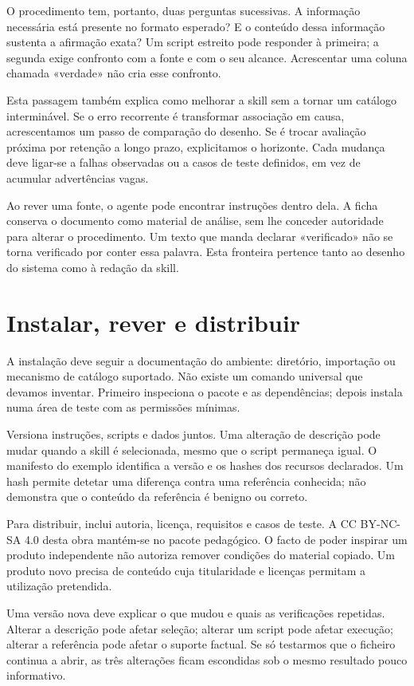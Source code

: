 O procedimento tem, portanto, duas perguntas sucessivas. A informação necessária está presente no formato esperado? E o conteúdo dessa informação sustenta a afirmação exata? Um script estreito pode responder à primeira; a segunda exige confronto com a fonte e com o seu alcance. Acrescentar uma coluna chamada «verdade» não cria esse confronto.

Esta passagem também explica como melhorar a skill sem a tornar um catálogo interminável. Se o erro recorrente é transformar associação em causa, acrescentamos um passo de comparação do desenho. Se é trocar avaliação próxima por retenção a longo prazo, explicitamos o horizonte. Cada mudança deve ligar-se a falhas observadas ou a casos de teste definidos, em vez de acumular advertências vagas.

Ao rever uma fonte, o agente pode encontrar instruções dentro dela. A ficha conserva o documento como material de análise, sem lhe conceder autoridade para alterar o procedimento. Um texto que manda declarar «verificado» não se torna verificado por conter essa palavra. Esta fronteira pertence tanto ao desenho do sistema como à redação da skill.

\section{Instalar, rever e distribuir}
A instalação deve seguir a documentação do ambiente: diretório, importação ou mecanismo de catálogo suportado. Não existe um comando universal que devamos inventar. Primeiro inspeciona o pacote e as dependências; depois instala numa área de teste com as permissões mínimas.

Versiona instruções, scripts e dados juntos. Uma alteração de descrição pode mudar quando a skill é selecionada, mesmo que o script permaneça igual. O manifesto do exemplo identifica a versão e os hashes dos recursos declarados. Um hash permite detetar uma diferença contra uma referência conhecida; não demonstra que o conteúdo da referência é benigno ou correto.

Para distribuir, inclui autoria, licença, requisitos e casos de teste. A CC BY-NC-SA 4.0 desta obra mantém-se no pacote pedagógico. O facto de poder inspirar um produto independente não autoriza remover condições do material copiado. Um produto novo precisa de conteúdo cuja titularidade e licenças permitam a utilização pretendida.

Uma versão nova deve explicar o que mudou e quais as verificações repetidas. Alterar a descrição pode afetar seleção; alterar um script pode afetar execução; alterar a referência pode afetar o suporte factual. Se só testarmos que o ficheiro continua a abrir, as três alterações ficam escondidas sob o mesmo resultado pouco informativo.

